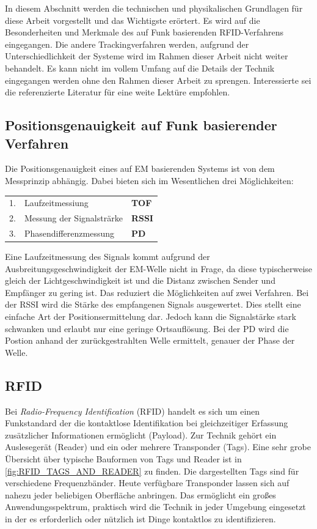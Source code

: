 In diesem Abschnitt werden die technischen und physikalischen Grundlagen für diese Arbeit vorgestellt und das Wichtigste erörtert. Es wird auf die Besonderheiten und Merkmale des auf Funk basierenden RFID-Verfahrens eingegangen. Die andere Trackingverfahren werden, aufgrund der Unterschiedlichkeit der Systeme wird im Rahmen dieser Arbeit nicht weiter behandelt. Es kann nicht im vollem Umfang auf die Details der Technik eingegangen werden ohne den Rahmen dieser Arbeit zu sprengen. Interessierte sei die referenzierte Literatur für eine weite Lektüre empfohlen.
%
%
\subsection{Positionsgenauigkeit auf Funk basierender Verfahren}
\label{sec:RFID_Accuracy}
Die Positionsgenauigkeit eines auf EM basierenden Systems ist von dem Messprinzip abhängig. Dabei bieten sich im Wesentlichen drei Möglichkeiten:
%
\begin{table} [ht!]
	\begin{center}
		\begin{tabular}{lp{65mm}p{15mm}}
		1. & Laufzeitmessiung & \textbf{TOF} \\
		2. & Messung der Signalsträrke & \textbf{RSSI} \\
		3. & Phasendifferenzmessung & \textbf{PD} \\
		\end{tabular}
	\end{center}
\end{table}
%

Eine Laufzeitmessung des Signals kommt aufgrund der Ausbreitungsgeschwindigkeit der EM-Welle nicht in Frage, da diese typischerweise gleich der Lichtgeschwindigkeit ist und die Distanz zwischen Sender und Empfänger zu gering ist. Das reduziert die Möglichkeiten auf zwei Verfahren.
Bei der RSSI wird die Stärke des empfangenen Signals ausgewertet. Dies stellt eine einfache Art der Positionsermittelung dar. Jedoch kann die Signalstärke stark schwanken und erlaubt nur eine geringe Ortsauflösung.
Bei der PD wird die Postion anhand der zurückgestrahlten Welle ermittelt, genauer der Phase der Welle.

\subsection{RFID}
%
Bei \textit{Radio-Frequency Identification} (RFID) handelt es sich um einen Funkstandard der die kontaktlose Identifikation bei gleichzeitiger Erfassung zusätzlicher Informationen ermöglicht (Payload). Zur Technik gehört ein Auslesegerät (Reader) und ein oder mehrere Transponder (Tags). Eine sehr grobe Übersicht über typische Bauformen von Tags und Reader ist in \ref{fig:RFID_TAGS_AND_READER} zu finden. Die dargestellten Tags sind für verschiedene Frequenzbänder. Heute verfügbare Transponder lassen sich auf nahezu jeder beliebigen Oberfläche anbringen. Das ermöglicht ein großes Anwendungsspektrum, praktisch wird die Technik in jeder Umgebung eingesetzt in der es erforderlich oder nützlich ist Dinge kontaktlos zu identifizieren. \\

